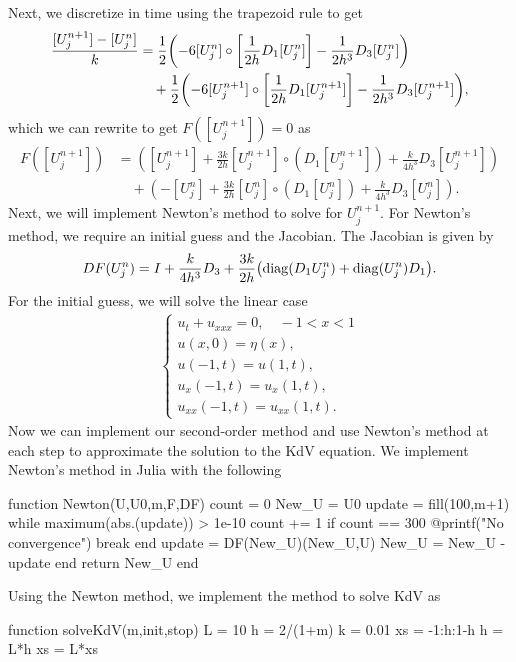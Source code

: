 \documentclass[12pt]{report}
\begin{document}
\begin{solution}
\begin{enumerate}
\[        \]
        Next, we discretize in time using the trapezoid rule to get
        \begin{align*}
            \frac{[U_j^{n+1}] - [U_j^n]}{k} &= \frac{1}{2}{\left(-6[U_j^{n}] \circ \left[\frac{1}{2h}D_1 [U_j^{n}]\right] - \frac{1}{2h^3}D_3[U_j^{n}]\right)}\\ 
            &\quad + \frac{1}{2}{\left(-6[U_j^{n+1}] \circ \left[\frac{1}{2h}D_1 [U_j^{n+1}]\right] - \frac{1}{2h^3}D_3[U_j^{n+1}]\right)},
        \end{align*}
        which we can rewrite to get $F([U_j^{n+1}]) = 0$ as
        \begin{align*}
            F([U_{j}^{n+1}]) &= \left( [U_{j}^{n+1}] + \frac{3k}{2h}[U_{j}^{n+1}] \circ (D_1 [U_{j}^{n+1}]) + \frac{k}{4h^3}D_3 [U_{j}^{n+1}]\right)\\ 
            &\quad + \left( -[U_{j}^{n}] + \frac{3k}{2h}[U_{j}^{n}] \circ (D_1 [U_{j}^{n}]) + \frac{k}{4h^3}D_3 [U_{j}^{n}]\right).
        \end{align*}
        Next, we will implement Newton's method to solve for $U_j^{n+1}$. For Newton's method, we require an initial guess and the Jacobian. The Jacobian is given by 
        \[
            DF(U_j^n) = I + \frac{k}{4h^3}D_3 + \frac{3k}{2h}{\left(\mathrm{diag}(D_1U_j^n) + \mathrm{diag}(U_j^n)D_1\right)}.
        \]
        For the initial guess, we will solve the linear case
        \begin{align*}
            \begin{cases} u_t + u_{xxx} = 0, \quad -1 < x < 1\\
                u(x,0) = \eta(x),\\
                u(-1,t) = u(1,t),\\
            u_x(-1,t) = u_x(1,t),\\
            u_{xx}(-1,t) = u_{xx}(1,t).\end{cases}
        \end{align*}
        Now we can implement our second-order method and use Newton's method at each step to approximate the solution to the KdV equation. We implement Newton's method in Julia with the following
        \begin{python}
function Newton(U,U0,m,F,DF)
    count = 0
    New_U = U0
    update = fill(100,m+1)
    while maximum(abs.(update)) > 1e-10
        count += 1
        if count == 300
            @printf("No convergence")
        break
        end
        update = DF(New_U)\F(New_U,U)
        New_U = New_U - update
    end
    return New_U
end
        \end{python}
        Using the Newton method, we implement the method to solve KdV as
        \begin{python}
function solveKdV(m,init,stop)
    L = 10
    h = 2/(1+m)
    k = 0.01
    xs = -1:h:1-h
    h = L*h
    xs = L*xs


\end{python}
\end{enumerate}
\end{solution}
\end{document}
